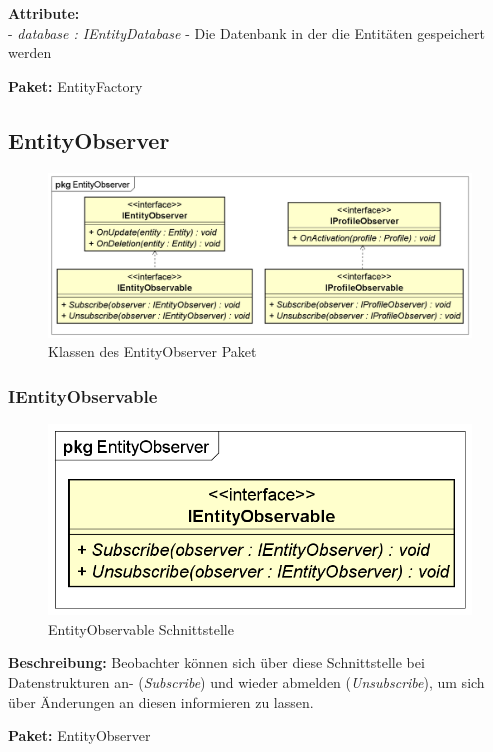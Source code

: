 \documentclass[a4paper]{scrreprt}
\begin{document}
\textbf{Attribute:}\\
- \textit{database : IEntityDatabase} - Die Datenbank in der die Entitäten gespeichert werden

\textbf{Paket:} EntityFactory


\subsection{EntityObserver}
\begin{figure}[H]
\centering
\includegraphics[width=0.75\textheight]{graphics/Klassendiagramme/Model/EntityObserverPackage.png}
\caption{Klassen des EntityObserver Paket}
\end{figure}

\subsubsection{IEntityObservable}
\begin{figure}[H]
\centering
\includegraphics[width=0.55\textheight]{graphics/Klassendiagramme/Model/IEntityObservable.png}
\caption{EntityObservable Schnittstelle}
\end{figure}
\textbf{Beschreibung:} Beobachter können sich über diese Schnittstelle bei Datenstrukturen an- (\textit{Subscribe}) und wieder abmelden (\textit{Unsubscribe}), um sich über Änderungen an diesen informieren zu lassen.

\textbf{Paket:} EntityObserver
\end{document}
